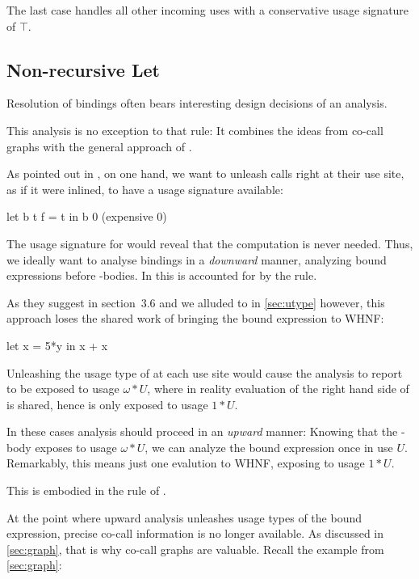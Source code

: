 The last case handles all other incoming uses with a conservative usage signature of $\top$.

\subsection{Non-recursive Let}\label{sec:let}

Resolution of  bindings often bears interesting design decisions of an analysis.

This analysis is no exception to that rule:
It combines the ideas from co-call graphs \parencite{callarity} with the general approach of \textcite{card}.

As pointed out in \textcite[Section~3.5]{card}, on one hand, we want to unleash calls right at their use site, as if it were inlined, to have a usage signature available:

\begin{haskellcode}
  let b t f = t
  in b 0 (expensive 0)
\end{haskellcode}

The usage signature for  would reveal that the  computation is never needed.
Thus, we ideally want to analyse  bindings in a \emph{downward} manner, analyzing bound expressions before -bodies.
In \textcite{card} this is accounted for by the  rule.

As they suggest in section~3.6 and we alluded to in \cref{sec:utype} however, this approach loses the shared work of bringing the bound expression to WHNF:

\begin{haskellcode}
let x = 5*y
in x + x
\end{haskellcode}

Unleashing the usage type of  at each use site would cause the analysis to report  to be exposed to usage $\omega*U$, where in reality evaluation of the right hand side of  is shared, hence  is only exposed to usage $1*U$.

In these cases analysis should proceed in an \emph{upward} manner: 
Knowing that the -body exposes  to usage $\omega*U$, we can analyze the bound expression once in use $U$. 
Remarkably, this means just one evalution to WHNF, exposing  to usage $1*U$.

This is embodied in the  rule of \textcite{card}.

At the point where upward analysis unleashes usage types of the bound expression, precise co-call information is no longer available.
As discussed in \cref{sec:graph}, that is why co-call graphs are valuable. Recall the example from \cref{sec:graph}:

